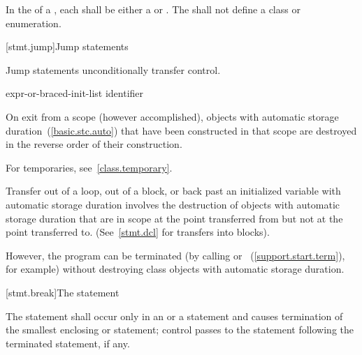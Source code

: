 \pnum
In the  of a ,
each  shall be either a 
or . The  shall not define a
class or enumeration.%

[stmt.jump]{Jump statements}%

\pnum
Jump statements unconditionally transfer control.
%

%
%
%
%
%
%
\begin{bnf}
\br
    \br
    \br
     expr-or-braced-init-list\opt{} \terminal{;}\br
     identifier \terminal{;}
\end{bnf}

\pnum
{}%
%
On exit from a scope (however accomplished), objects with automatic storage
duration~(\ref{basic.stc.auto}) that have been constructed in that scope are destroyed
in the reverse order of their construction. \begin{note} For temporaries,
see~\ref{class.temporary}. \end{note} Transfer out of a loop, out of a block, or back
past
an initialized variable with automatic storage duration involves the
destruction of objects with automatic storage duration that are in
scope at the point transferred from but not at the point transferred to.
(See~\ref{stmt.dcl} for transfers into blocks).
\begin{note}
However, the program can be terminated (by calling
%
%
 or
%
%
~(\ref{support.start.term}), for example) without
destroying class objects with automatic storage duration.
\end{note}

[stmt.break]{The  statement}%

\pnum
The  statement shall occur only in an
%
%
 or a  statement and causes
termination of the smallest enclosing  or
 statement; control passes to the statement following the
terminated statement, if any.

